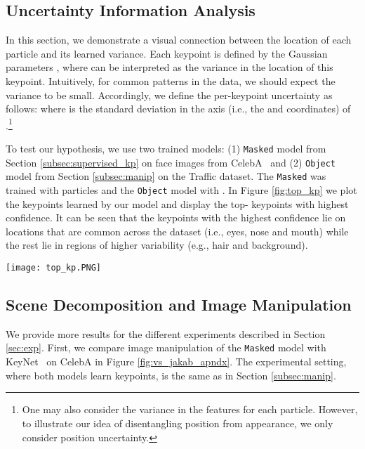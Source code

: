 \documentclass[nohyperref]{article}
\theoremstyle{plain}
\theoremstyle{definition}
\theoremstyle{remark}
\begin{document}
\subsection{Uncertainty Information Analysis}
\label{apndx:uncertainty}
In this section, we demonstrate a visual connection between the location of each particle and its learned variance.
Each keypoint  is defined by the Gaussian parameters , where  can be interpreted as the variance in the location of this keypoint. Intuitively, for common patterns in the data, 
we should expect the variance to be small.
Accordingly, we define the per-keypoint uncertainty as follows:  where  is the standard deviation in the  axis (i.e., the  and  coordinates) of .\footnote{One may also consider the variance in the features for each particle. However, to illustrate our idea of disentangling position from appearance, we only consider position uncertainty.}

To test our hypothesis, we use two trained models: (1) \texttt{Masked} model from Section \ref{subsec:supervised_kp} on  face images from CelebA~\citep{liu2015faceattributes} and (2) \texttt{Object} model from Section \ref{subsec:manip} on the Traffic dataset. The \texttt{Masked} was trained with  particles and the \texttt{Object} model with . In Figure \ref{fig:top_kp} we plot the  keypoints learned by our model and display the top- keypoints with highest confidence. It can be seen that the keypoints with the highest confidence lie on locations that are common across the dataset (i.e., eyes, nose and mouth) while the rest lie in regions of higher variability (e.g., hair and background).

\begin{figure*}[h]
     \centering
     \texttt{[image: top\_kp.PNG]}
        \caption{Information from uncertainty. We show the  particles (second row) learned from two models and top- particles with the highest confidence (third row): (1) \texttt{Masked} model trained on CelebA (left); and (2) \texttt{Object} model trained on Traffic (right).}
        \label{fig:top_kp}
\end{figure*}

\subsection{Scene Decomposition and Image Manipulation}
\label{apndx:scene_manip_res}
We provide more results for the different experiments described in Section \ref{sec:exp}. First, we compare image manipulation of the \texttt{Masked} model with KeyNet~\citep{jakab2018unsupervised} on CelebA in Figure \ref{fig:vs_jakab_apndx}. The experimental setting, where both models learn  keypoints, is the same as in Section \ref{subsec:manip}.
\end{document}
